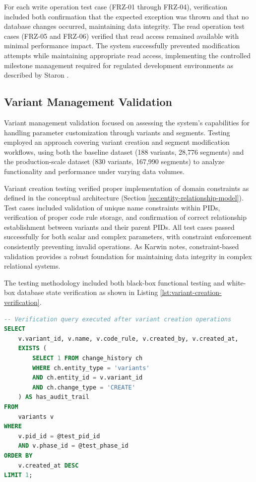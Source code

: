 For each write operation test case (FRZ-01 through FRZ-04), verification included both confirmation that the expected exception was thrown and that no database changes occurred, maintaining data integrity. The read operation test cases (FRZ-05 and FRZ-06) verified that read access remained available with minimal performance impact. The system successfully prevented modification attempts while maintaining appropriate read access, implementing the controlled milestone management required for regulated development environments as described by Staron \cite{staron2021automotive}.

\subsection{Variant Management Validation}
\label{subsec:variant-management-validation}

Variant management validation focused on assessing the system's capabilities for handling parameter customization through variants and segments. Testing employed an approach covering variant creation and segment modification workflows, using both the baseline dataset (188 variants, 28,776 segments) and the production-scale dataset (830 variants, 167,990 segments) to analyze functionality and performance under varying data volumes.

Variant creation testing verified proper implementation of domain constraints as defined in the conceptual architecture (Section \ref{sec:entity-relationship-model}). Test cases included validation of unique name constraints within \acp{PID}, verification of proper code rule storage, and confirmation of correct relationship establishment between variants and their parent \acp{PID}. All test cases passed successfully for both scalar and complex parameters, with constraint enforcement consistently preventing invalid operations. As Karwin \cite{karwin2010sql} notes, constraint-based validation provides a robust foundation for maintaining data integrity in complex relational systems.

The testing methodology included both black-box functional testing and white-box database state verification as shown in Listing \ref{lst:variant-creation-verification}.

\begin{lstlisting}[language=SQL, caption={Variant Creation Verification Query}, label={lst:variant-creation-verification}]
-- Verification query executed after variant creation operations
SELECT 
    v.variant_id, v.name, v.code_rule, v.created_by, v.created_at,
    EXISTS (
        SELECT 1 FROM change_history ch 
        WHERE ch.entity_type = 'variants' 
        AND ch.entity_id = v.variant_id
        AND ch.change_type = 'CREATE'
    ) AS has_audit_trail
FROM 
    variants v
WHERE 
    v.pid_id = @test_pid_id
    AND v.phase_id = @test_phase_id
ORDER BY 
    v.created_at DESC
LIMIT 1;
\end{lstlisting}

